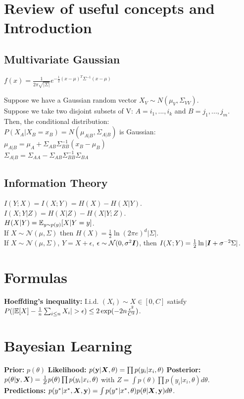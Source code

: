 \section{Review of useful concepts and Introduction}
\subsection{Multivariate Gaussian}
$f(x) = \frac{1}{2\pi \sqrt{|\Sigma|}} e^{- \frac{1}{2} (x-\mu)^T \Sigma^{-1} (x-\mu)}$

Suppose we have a Gaussian random vector $X_V \sim N(\mu_V, \Sigma_{VV})$.\\
Suppose we take two disjoint subsets of V: $A={i_1,...,i_k}$ and $B={j_1,...,j_m}$.\\
Then, the conditional distribution: \\
$P(X_A|X_B=x_B)=N(\mu_{A|B}, \Sigma_{A|B})$ is Gaussian:\\
$\mu_{A|B}=\mu_A+\Sigma_{AB}\Sigma^{-1}_{BB}(x_B-\mu_B)$\\
$\Sigma_{A|B}=\Sigma_{AA}-\Sigma_{AB}\Sigma^{-1}_{BB}\Sigma_{BA}$

\subsection{Information Theory}
$I(Y;X) = I(X;Y) = H(X) - H(X|Y)$.\\
$I(X;Y|Z) = H(X|Z) - H(X|Y;Z)$.\\
$H(X|Y) = \mathbb{E}_{y\sim p(y)}[X|Y=y]$.\\
If $X\sim\mathcal{N}(\mu, \Sigma)$ then $H(X) = \frac{1}{2}\ln(2\pi e)^d|\Sigma|$.\\
If $X\sim\mathcal{N}(\mu, \Sigma)$, $Y = X + \epsilon$, $\epsilon\sim\mathcal{N}(0,\sigma^2{\bm{I}})$, then $I(X;Y) = \frac{1}{2}\ln|{\bm{I}}+\sigma^{-2}\Sigma|$.

\section{Formulas}
\textbf{Hoeffding's inequality:} I.i.d. $(X_i)\sim X\in[0,C]$ satisfy $P(|\E[X] - \frac{1}{n}\sum_{i\leq n}X_i|>\epsilon) \leq 2\exp(-2n\frac{\epsilon^2}{C^2})$.

\section{Bayesian Learning}
\textbf{Prior:} $p(\theta)$
\textbf{Likelihood:} $p({\mathbf{y}}|{\bm{X}},\theta) = \prod p(y_i|x_i,\theta)$
\textbf{Posterior:} $p(\theta|{\mathbf{y}},{\bm{X}}) = \frac{1}{Z}p(\theta)\prod p(y_i|x_i, \theta)$ with $Z = \int p(\theta)\prod p(y_i|x_i, \theta) d\theta$.
\textbf{Predictions:} $p(y^*|x^*,{\bm{X}},{\mathbf{y}}) = \int p(y^*|x^*,\theta)p(\theta|{\bm{X}}, {\mathbf{y}}) d\theta$. 


